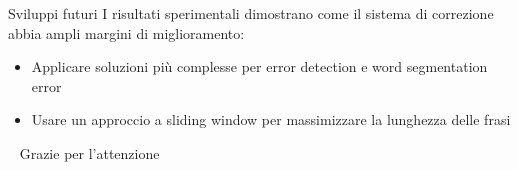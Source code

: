 \documentclass{beamer}
\begin{document}
\begin{frame}{Sviluppi futuri}
I risultati sperimentali dimostrano come il sistema di correzione abbia ampli margini di miglioramento:
\begin{itemize}
\item Applicare soluzioni più complesse per error detection e word segmentation error
\item Usare un approccio a sliding window per massimizzare la lunghezza delle frasi
\end{itemize}

\end{frame}



\begin{frame}{\ }
\huge
{Grazie per l'attenzione}
\end{frame}
	
\end{document}
